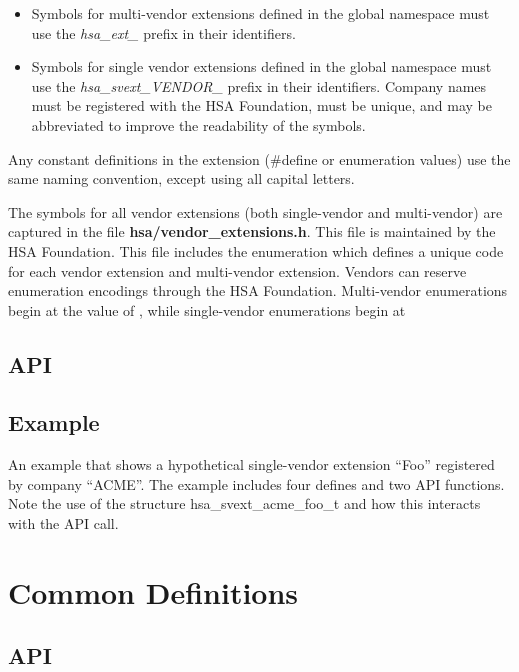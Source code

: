 \documentclass[final]{book}
\newcommand{\reftyp}[1]{#1}
\begin{document}
\begin{itemize}
\item Symbols for multi-vendor extensions defined in the global namespace must
  use the \emph{hsa_ext_} prefix in their identifiers.
\item Symbols for single vendor extensions defined in the global namespace must
  use the \emph{hsa_svext_VENDOR_} prefix in their identifiers. Company names
  must be registered with the HSA Foundation, must be unique, and may be
  abbreviated to improve the readability of the symbols.
\end{itemize}

Any constant definitions in the extension (\#define or enumeration values) use
the same naming convention, except using all capital letters.

The symbols for all vendor extensions (both single-vendor and multi-vendor) are
captured in the file {\bf hsa/vendor_extensions.h}. This file is maintained by
the HSA Foundation. This file includes the enumeration 
which defines a unique code for each vendor extension and multi-vendor
extension. Vendors can reserve enumeration encodings through the HSA
Foundation. Multi-vendor enumerations begin at the value of
, while single-vendor enumerations begin at

\subsection{API}


\subsection{Example}
An example that shows a hypothetical single-vendor extension ``Foo'' registered
by company ``ACME''. The example includes four defines and two API functions.
Note the use of the structure \reftyp{hsa_svext_acme_foo_t} and how this
interacts with the  API call.



\section{Common Definitions}\label{sec:other}
\subsection{API}

%
\end{document}
